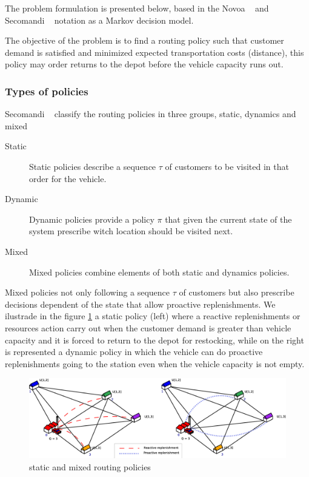 The problem formulation is presented below, based in the Novoa ~\cite{novoa_approximate_2009} and Secomandi ~\cite{secomandi_rollout_2001} notation as a Markov decision model.

The objective of the problem is to find a routing policy such that customer demand is satisfied and minimized expected transportation costs (distance), this policy may order returns to the depot before the vehicle capacity runs out.

\subsubsection{Types of policies}

Secomandi ~\cite{secomandi_comparing_2000} classify the routing policies in three groups, static, dynamics and mixed

\begin{description}
  \item[Static] Static policies describe a sequence $\tau$ of customers to be visited in that order for the vehicle.
  \item[Dynamic] Dynamic policies provide a policy $\pi$ that given the current state of the system prescribe witch location should be visited next.
  \item[Mixed] Mixed policies combine elements of both static and dynamics policies.
\end{description}

Mixed policies not only following a sequence $\tau$ of customers but also prescribe decisions dependent of the state that allow proactive replenishments. We ilustrade in the figure \ref{fig:routing_policies} a static policy (left) where a reactive replenishments or resources action carry out when the customer demand is greater than vehicle capacity and it is forced to return to the depot for restocking, while on the right is represented a dynamic policy in which the vehicle can do proactive replenishments going to the station even when the vehicle capacity is not empty.

\begin{figure}[!htbp]
  \begin{center}
   \includegraphics[width=1\textwidth]{Images/Chapter2/exIns4a.eps}
  \end{center}
    \caption{static and mixed routing policies}\label{fig:routing_policies}
\end{figure}


